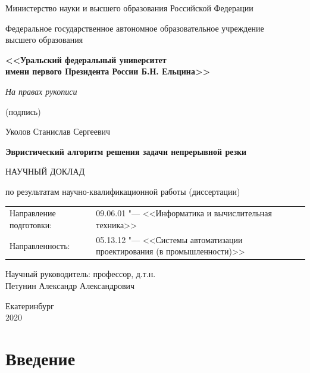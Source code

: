 \documentclass[14pt]{extarticle}
\theoremstyle{plain}%
\theoremstyle{definition}
\theoremstyle{remark}
\begin{document}
\thispagestyle{empty}
\begin{center}
{\small
Министерство науки и высшего образования Российской Федерации

Федеральное государственное автономное образовательное учреждение \\
высшего образования

\textbf{<<Уральский федеральный университет\\
имени первого Президента России Б.Н. Ельцина>>}
}

\vspace{0pt plus2fill}
\begin{flushright}
\begin{minipage}{0.5\linewidth}
  \centering
  \textit{На правах рукописи}

  \small {(подпись)}
\end{minipage}
\end{flushright}


\vspace{0pt plus4fill}
Уколов Станислав Сергеевич

\vspace{0pt plus1fill}
\textbf{
Эвристический алгоритм решения задачи непрерывной резки
}

\vspace{0pt plus1fill}
НАУЧНЫЙ ДОКЛАД

по результатам научно-квалификационной работы (диссертации)

\vspace{0pt plus2fill}
\begin{tabular}{l p{10cm}}
  Направление подготовки: &
  09.06.01
  "---
  <<Информатика и вычислительная техника>>
  \\
  Направленность: &
  05.13.12
  "---
  <<Системы автоматизации проектирования (в промышленности)>>
\end{tabular}

\vspace{0pt plus4fill}
\begin{flushright}
Научный руководитель:
профессор,
д.т.н.
\\
Петунин Александр Александрович
\end{flushright}

\vspace{0pt plus6fill}
Екатеринбург
\\
2020
\end{center}
\newpage

\tableofcontents
\newpage

\section{Введение}
\end{document}
